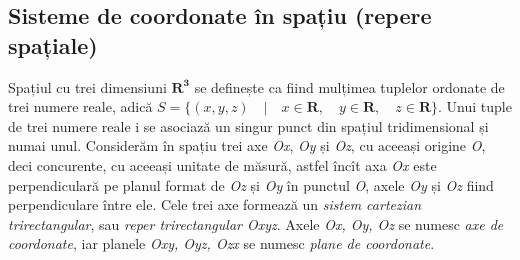 \subsection{Sisteme de coordonate în spațiu (repere spațiale)}
\label{ch1:sec_coord_sys:space}
\indent

Spațiul cu trei dimensiuni $\mathbf{R^3}$ se definește ca fiind mulțimea
tuplelor ordonate de trei numere reale, adică $S = \lbrace (x, y, z) \quad
\vert \quad x \in \mathbf{R}, \quad y \in \mathbf{R}, \quad z \in \mathbf{R}
\rbrace$. Unui tuple de trei numere reale i se asociază un singur punct din
spațiul tridimensional și numai unul. Considerăm în spațiu trei axe \textit{Ox},
\textit{Oy} și \textit{Oz}, cu aceeași origine \textit{O}, deci concurente, cu
aceeași unitate de măsură, astfel încît axa \textit{Ox} este perpendiculară pe
planul format de \textit{Oz} și \textit{Oy} în punctul \textit{O}, axele
\textit{Oy} și \textit{Oz} fiind perpendiculare între ele. Cele trei axe
formează un \textit{sistem cartezian trirectangular}, sau \textit{reper
trirectangular Oxyz}. Axele \textit{Ox, Oy, Oz} se numesc \textit{axe de
coordonate}, iar planele \textit{Oxy, Oyz, Ozx} se numesc \textit{plane de
coordonate}.
